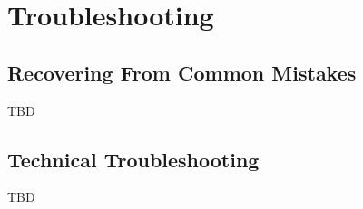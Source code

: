 \section{Troubleshooting}

\subsection{Recovering From Common Mistakes}
\label{sec:recovering}

TBD

\subsection{Technical Troubleshooting}

TBD
